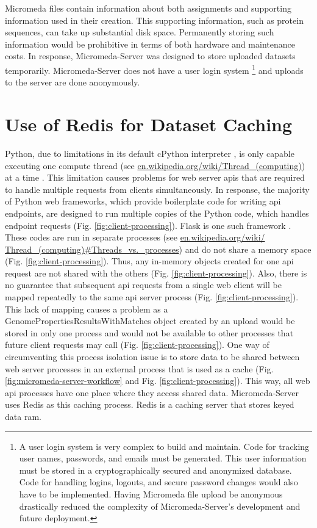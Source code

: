 Micromeda files contain information about both assignments and supporting 
information used in their creation. This supporting information, such as protein 
sequences, can take up substantial disk space. Permanently storing such 
information would be prohibitive in terms of both hardware and maintenance 
costs. In response, Micromeda-Server was designed to store uploaded datasets 
temporarily. Micromeda-Server does not have a user login system \footnote{A user 
login system is very complex to build and maintain. Code for tracking user 
names, passwords, and emails must be generated. This user information must be 
stored in a cryptographically secured and anonymized database. Code for handling 
logins, logouts, and secure password changes would also have to be implemented. 
Having Micromeda file upload be anonymous drastically reduced the complexity of 
Micromeda-Server's development and future deployment.} and uploads to the server 
are done anonymously.

\section{Use of Redis for Dataset Caching} \label{redis-caching}

Python, due to limitations in its default cPython interpreter 
\cite{van1995python}, is only capable executing one compute thread 
\cite{saltzer1966traffic} (see 
\href{http://en.wikipedia.org/wiki/Thread_(computing)}{en.wikipedia.org/wiki/Thread\_(computing)}) 
at a time \cite{beazley2010understanding}. This limitation causes problems for 
web server \gls{api}s that are required to handle multiple requests from clients 
simultaneously. In response, the majority of Python web frameworks, which 
provide boilerplate code for writing \gls{api} endpoints, are designed to run 
multiple copies of the Python code, which handles endpoint requests (Fig. 
\ref{fig:client-processing}). Flask is one such framework 
\cite{grinberg2018flask}. These codes are run in separate processes (see 
\href{http://en.wikipedia.org/wiki/Thread_(computing)\#Threads\_vs.\_processes}{en.wikipedia.org/wiki/ 
Thread\_(computing)\#Threads\_vs.\_processes}) and do not share a memory space 
(Fig. \ref{fig:client-processing}). Thus, any in-memory objects created for one 
\gls{api} request are not shared with the others (Fig. 
\ref{fig:client-processing}). Also, there is no guarantee that subsequent 
\gls{api} requests from a single web client will be mapped repeatedly to the 
same \gls{api} server process (Fig. \ref{fig:client-processing}). This lack of 
mapping causes a problem as a GenomePropertiesResultsWithMatches object created 
by an upload would be stored in only one process and would not be available to 
other processes that future client requests may call (Fig. 
\ref{fig:client-processing}). One way of circumventing this process isolation 
issue is to store data to be shared between web server processes in an external 
process that is used as a cache (Fig. \ref{fig:micromeda-server-workflow} and 
Fig. \ref{fig:client-processing}). This way, all web \gls{api} processes have 
one place where they access shared data. Micromeda-Server uses Redis as this 
caching process. Redis is a caching server that stores keyed data \gls{ram}. 

